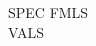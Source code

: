 \documentclass[preview,varwidth=\maxdimen,border=10pt]{standalone}
\begin{document}
\renewcommand{\arraystretch}{1.5}
\begin{tabular}{SPEC} \hline
FMLS \\ \hline
VALS \\ \hline
\end{tabular}
\end{document}
